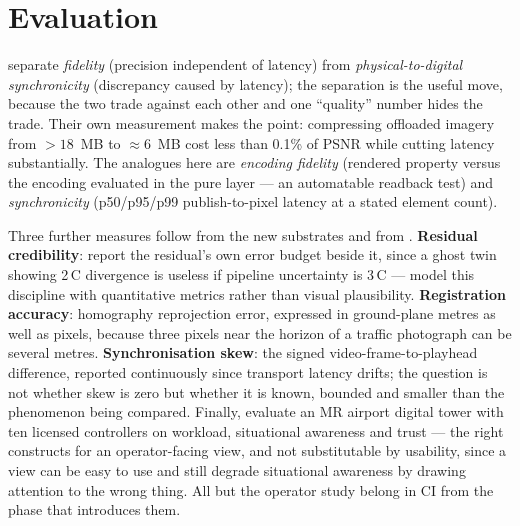\section{Evaluation}
\label{sec:evaluation}

\citet{mobilitydt2023} separate \emph{fidelity} (precision independent of latency) from
\emph{physical-to-digital synchronicity} (discrepancy caused by latency); the separation
is the useful move, because the two trade against each other and one ``quality'' number
hides the trade. Their own measurement makes the point: compressing offloaded imagery
from $>18$~MB to $\approx6$~MB cost less than 0.1\% of PSNR while cutting latency
substantially. The analogues here are \emph{encoding fidelity} (rendered property versus
the encoding evaluated in the pure layer --- an automatable readback test) and
\emph{synchronicity} (p50/p95/p99 publish-to-pixel latency at a stated element count).

Three further measures follow from the new substrates and from .
\textbf{Residual credibility}: report the residual's own error budget beside it, since a
ghost twin showing 2\,\textdegree C divergence is useless if pipeline uncertainty is
3\,\textdegree C --- \citet{liao2025digital} model this discipline with quantitative
metrics rather than visual plausibility. \textbf{Registration accuracy}: homography
reprojection error, expressed in ground-plane metres as well as pixels, because three
pixels near the horizon of a traffic photograph can be several metres.
\textbf{Synchronisation skew}: the signed video-frame-to-playhead difference, reported
continuously since transport latency drifts; the question is not whether skew is zero
but whether it is known, bounded and smaller than the phenomenon being compared. Finally,
\citet{chen2024tangible} evaluate an MR airport digital tower with ten licensed
controllers on workload, situational awareness and trust --- the right constructs for an
operator-facing view, and not substitutable by usability, since a view can be easy to use
and still degrade situational awareness by drawing attention to the wrong thing. All but
the operator study belong in CI from the phase that introduces them.
